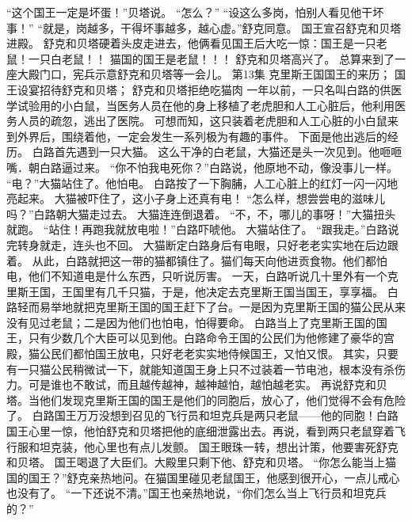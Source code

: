 \documentclass[a4paper,12pt,UTF8,twoside]{ctexbook}
\begin{document}
        “这个国王一定是坏蛋！”贝塔说。 
        “怎么？” 
        “设这么多岗，怕别人看见他干坏事！” 
        “就是，岗越多，干得坏事越多，越心虚。”舒克同意。 
        国王宣召舒克和贝塔进殿。 
        舒克和贝塔硬着头皮走进去，他俩看见国王后大吃一惊：国王是一只老鼠！一只白老鼠！！ 
        猫国的国王是老鼠！！！ 
        舒克和贝塔高兴了。 
        总算来到了一座大殿门口，宪兵示意舒克和贝塔等一会儿。   第13集 
        克里斯王国国王的来历； 
        国王设宴招待舒克和贝塔； 
        舒克和贝塔拒绝吃猫肉 
        一年以前，一只名叫白路的供医学试验用的小白鼠，当医务人员在他的身上移植了老虎胆和人工心脏后，他利用医务人员的疏忽，逃出了医院。 
        可想而知，这只装着老虎胆和人工心脏的小白鼠来到外界后，围绕着他，一定会发生一系列极为有趣的事件。 
        下面是他出逃后的经历。 
        白路首先遇到一只大猫。 
        这么干净的白老鼠，大猫还是头一次见到。他咂咂嘴．朝白路逼过来。 
        “你不怕我电死你？”白路说，他原地不动，像没事儿一样。 
        “电？”大猫站住了。他怕电。 
        白路按了一下胸脯，人工心脏上的红灯一闪一闪地亮起来。 
        大猫被吓住了，这小子身上还真有电！ 
        “怎么样，想尝尝电的滋味儿吗？”白路朝大猫走过去。 
        大猫连连倒退着。 
        “不，不，哪儿的事呀！”大猫扭头就跑。 
        “站住！再跑我就放电啦！”白路吓唬他。 
        大猫站住了。 
        “跟我走。”白路说完转身就走，连头也不回。 
        大猫断定白路身后有电眼，只好老老实实地在后边跟着。 
        从此，白路就把这一带的猫都镇住了。猫们每天向他进贡食物。他们都怕电，他们不知道电是什么东西，只听说厉害。 
        一天，白路听说几十里外有一个克里斯王国，王国里有几千只猫，于是，他决定去克里斯王国当国王，享享福。 
        白路轻而易举地就把克里斯王国的国王赶下了台。一是因为克里斯王国的猫公民从来没有见过老鼠；二是因为他们也怕电，怕得要命。 
        白路当上了克里斯王国的国王，只有少数几个大臣可以见到他。白路命令王国的公民们为他修建了豪华的宫殿，猫公民们都怕国王放电，只好老老实实地侍候国王，又怕又恨。 
        其实，只要有一只猫公民稍微试一下，就能知道国王身上只不过装着一节电池，根本没有杀伤力。可是谁也不敢试，而且越传越神，越神越怕，越怕越老实。 
        再说舒克和贝塔。当他们发现克里斯王国的国王是他们的同胞后，放心了，他们觉得不会有危险了。 
        白路国王万万没想到召见的飞行员和坦克兵是两只老鼠——他的同胞！白路国王心里一惊，他怕舒克和贝塔把他的底细泄露出去。再说，看到两只老鼠穿着飞行服和坦克装，他心里也有点儿发颤。 
        国王眼珠一转，想出计策，他要害死舒克和贝塔。 
        国王喝退了大臣们。大殿里只剩下他、舒克和贝塔。 
        “你怎么能当上猫国的国王？”舒克亲热地问。在猫国里碰见老鼠国王，他感到很开心，一点儿戒心也没有了。 
        “一下还说不清。”国王也亲热地说，“你们怎么当上飞行员和坦克兵的？” 
\end{document}
